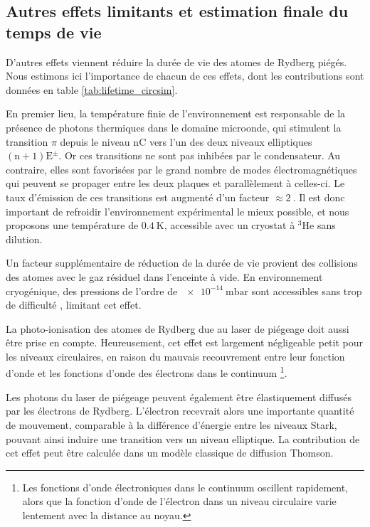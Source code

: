 \subsection{Autres effets limitants et estimation finale du temps de vie}
\noindent D'autres effets viennent réduire la durée de vie des atomes de Rydberg piégés.
Nous estimons ici l'importance de chacun de ces effets, dont les contributions sont données en table \eqref{tab:lifetime_circsim}.
%

En premier lieu, la température finie de l'environnement est responsable de la présence de photons thermiques dans le domaine microonde, qui stimulent la transition $\pi$ depuis le niveau $\mathrm{nC}$ vers l'un des deux niveaux elliptiques $\mathrm{(n+1)E^\pm}$.
Or ces transitions ne sont pas inhibées par le condensateur.
Au contraire, elles sont favorisées par le grand nombre de modes électromagnétiques qui peuvent se propager entre les deux plaques et parallèlement à celles-ci.
Le taux d'émission de ces transitions est augmenté d'un facteur $\approx \SI{2}{}$.
Il est donc important de refroidir l'environnement expérimental le mieux possible, et nous proposons une température de $\SI{0.4}{\K}$, accessible avec un cryostat à $^3$He sans dilution.

Un facteur supplémentaire de réduction de la durée de vie provient des collisions des atomes avec le gaz résiduel dans l'enceinte à vide.
En environnement cryogénique, des pressions de l'ordre de $\SI{e-14}{\milli\bar}$ sont accessibles sans trop de difficulté \cite{MX_GABRIELSEANTIPROTON90,MX_WERTHCRYOION98}, limitant cet effet.

La photo-ionisation des atomes de Rydberg due au laser de piégeage doit aussi être prise en compte.
Heureusement, cet effet est largement négligeable petit pour les niveaux circulaires, en raison du mauvais recouvrement entre leur fonction d'onde et les fonctions d'onde des électrons dans le continuum
\footnote{Les fonctions d'onde électroniques dans le continuum oscillent rapidement, alors que la fonction d'onde de l'électron dans un niveau circulaire varie lentement avec la distance au noyau.}.

Les photons du laser de piégeage peuvent également être élastiquement diffusés par les électrons de Rydberg. L'électron recevrait alors une importante quantité de mouvement, comparable à la différence d'énergie entre les niveaux Stark, pouvant ainsi induire une transition vers un niveau elliptique.
La contribution de cet effet peut être calculée dans un modèle classique de diffusion Thomson.

